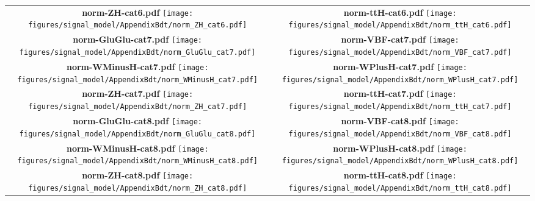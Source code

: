 \begin{longtable}{|c|c|}
{}
 \\
\hline
\parbox{0.47\textwidth}{
\centering
{\bfseries norm-ZH-cat6.pdf}
\texttt{[image: figures/signal\_model/AppendixBdt/norm\_ZH\_cat6.pdf]}
}
 & \parbox{0.47\textwidth}{
\centering
{\bfseries norm-ttH-cat6.pdf}
\texttt{[image: figures/signal\_model/AppendixBdt/norm\_ttH\_cat6.pdf]}
}
 \\
\hline
\parbox{0.47\textwidth}{
\centering
{\bfseries norm-GluGlu-cat7.pdf}
\texttt{[image: figures/signal\_model/AppendixBdt/norm\_GluGlu\_cat7.pdf]}
}
 & \parbox{0.47\textwidth}{
\centering
{\bfseries norm-VBF-cat7.pdf}
\texttt{[image: figures/signal\_model/AppendixBdt/norm\_VBF\_cat7.pdf]}
}
 \\
\hline
\parbox{0.47\textwidth}{
\centering
{\bfseries norm-WMinusH-cat7.pdf}
\texttt{[image: figures/signal\_model/AppendixBdt/norm\_WMinusH\_cat7.pdf]}
}
 & \parbox{0.47\textwidth}{
\centering
{\bfseries norm-WPlusH-cat7.pdf}
\texttt{[image: figures/signal\_model/AppendixBdt/norm\_WPlusH\_cat7.pdf]}
}
 \\
\hline
\parbox{0.47\textwidth}{
\centering
{\bfseries norm-ZH-cat7.pdf}
\texttt{[image: figures/signal\_model/AppendixBdt/norm\_ZH\_cat7.pdf]}
}
 & \parbox{0.47\textwidth}{
\centering
{\bfseries norm-ttH-cat7.pdf}
\texttt{[image: figures/signal\_model/AppendixBdt/norm\_ttH\_cat7.pdf]}
}
 \\
\hline
\parbox{0.47\textwidth}{
\centering
{\bfseries norm-GluGlu-cat8.pdf}
\texttt{[image: figures/signal\_model/AppendixBdt/norm\_GluGlu\_cat8.pdf]}
}
 & \parbox{0.47\textwidth}{
\centering
{\bfseries norm-VBF-cat8.pdf}
\texttt{[image: figures/signal\_model/AppendixBdt/norm\_VBF\_cat8.pdf]}
}
 \\
\hline
\parbox{0.47\textwidth}{
\centering
{\bfseries norm-WMinusH-cat8.pdf}
\texttt{[image: figures/signal\_model/AppendixBdt/norm\_WMinusH\_cat8.pdf]}
}
 & \parbox{0.47\textwidth}{
\centering
{\bfseries norm-WPlusH-cat8.pdf}
\texttt{[image: figures/signal\_model/AppendixBdt/norm\_WPlusH\_cat8.pdf]}
}
 \\
\hline
\parbox{0.47\textwidth}{
\centering
{\bfseries norm-ZH-cat8.pdf}
\texttt{[image: figures/signal\_model/AppendixBdt/norm\_ZH\_cat8.pdf]}
}
 & \parbox{0.47\textwidth}{
\centering
{\bfseries norm-ttH-cat8.pdf}
\texttt{[image: figures/signal\_model/AppendixBdt/norm\_ttH\_cat8.pdf]}
}
\end{longtable}
